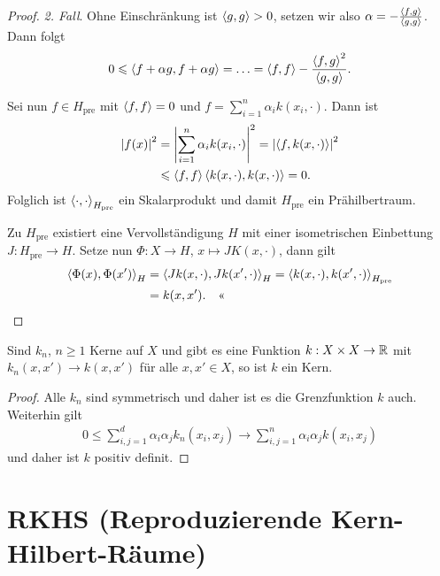 \begin{proof}
\textit{2. Fall}. Ohne Einschränkung ist $\left\langle g,g\right\rangle>0$, setzen wir also $\alpha
= - \frac{\left\langle f,g\right\rangle}{\left\langle g,g\right\rangle}$. Dann folgt
\begin{align*}
0\leqslant \left\langle f+\alpha g,f+\alpha g\right\rangle = \ldots = \left\langle f,f\right\rangle -
\frac{\left\langle f,g\right\rangle^2}{\left\langle g,g\right\rangle}.
\end{align*}


Sei nun $f\in H_\mathrm{pre}$ mit $\left\langle f,f\right\rangle = 0$ und
$
f= \sum_{i=1}^n \alpha_i k(x_i,\cdot).
$
Dann ist
\begin{align*}
\left|f(x)\right|^2 &= \left|\sum_{i=1}^n \alpha_i k(x_i,\cdot)\right|^2
=
\left|\left\langle f,k(x,\cdot)\right\rangle\right|^2\\
&\leqslant \left\langle f,f\right\rangle\left\langle k(x,\cdot),k(x,\cdot)\right\rangle = 0.
\end{align*}
Folglich ist $\left\langle\cdot,\cdot\right\rangle_{H_\mathrm{pre}}$ ein Skalarprodukt und damit
$H_\mathrm{pre}$ ein Prähilbertraum.

Zu $H_\mathrm{pre}$ existiert eine Vervollständigung $H$ mit einer isometrischen
Einbettung $J: H_\mathrm{pre}\to H$.
Setze nun $\Phi: X \to H$, $x\mapsto JK(x,\cdot)$, dann gilt
\begin{align*}
\left\langle\Phi(x),\Phi(x')\right\rangle_H &= \left\langle Jk(x,\cdot),Jk(x',\cdot)\right\rangle_H =
\left\langle k(x,\cdot),k(x',\cdot)\right\rangle_{H_\mathrm{pre}} \\ &= k(x,x').\quad\text{<<}
\end{align*}
\end{proof}

\begin{cor}
\label{prop:5.1.12}
Sind $k_n$, $n\ge 1$ Kerne auf $X$ und gibt es eine Funktion
$k: X\times X \to \mathbb{R}$ mit $k_n(x,x')\to k(x,x')$ für alle $x,x'\in X$, so ist
$k$ ein Kern.\fishhere
\end{cor}
\begin{proof}
Alle $k_n$ sind symmetrisch und daher ist es die Grenzfunktion $k$ auch.
Weiterhin gilt
\begin{align*}
0 \le \sum_{i,j=1}^d \alpha_i\alpha_j k_n(x_i,x_j) \to
\sum_{i,j=1}^n \alpha_i\alpha_j k(x_i,x_j)
\end{align*}
und daher ist $k$ positiv definit.\qedhere
\end{proof}

\section{RKHS (Reproduzierende Kern-Hilbert-Räume)}


